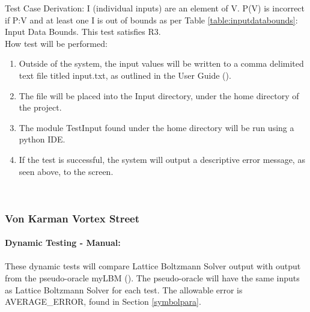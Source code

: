 \documentclass[12pt, titlepage]{article}
\newcommand{\myprogname}{Lattice Boltzmann Solver}
\begin{document}
\begin{enumerate}
Test Case Derivation: 
I (individual inputs) are an element of V. P(V) is incorrect if P:V and at least one I is out of bounds as per Table \ref{table:inputdatabounds}: Input Data Bounds. This test satisfies R3.\\ 

					
How test will be performed: 

\begin{enumerate}
\item Outside of the system, the input values will be written to a comma delimited text file titled input.txt, as outlined in the User Guide (\citet{LBM_UserGuide_PM}).
\item The file will be placed into the Input directory, under the home directory of the project.
\item The module TestInput found under the home directory will be run using a python IDE.
\item If the test is successful, the system will output a descriptive error message, as seen above, to the screen.\\


\end{enumerate}

\end{enumerate}

~\newpage

\subsubsection{Von Karman Vortex Street}
\label{frvkvs}
		
\paragraph{Dynamic Testing - Manual:}
\paragraph{} These dynamic tests will compare {\myprogname} output with output from the pseudo-oracle myLBM (\citet{pylbmcode}). The pseudo-oracle will have the same inputs as {\myprogname} for each test. The allowable error is AVERAGE\_ERROR, found in Section \ref{symbolpara}.
\end{document}
